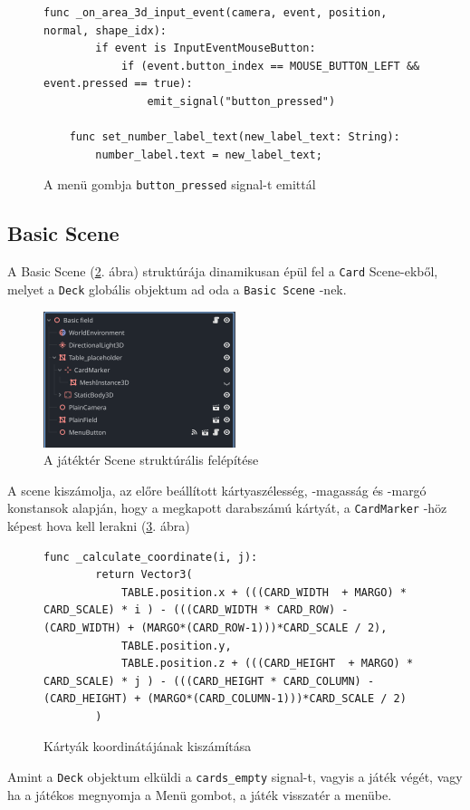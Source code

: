 \begin{figure}[H]
    \centering
    \begin{lstlisting}[language=GDScript]
    func _on_area_3d_input_event(camera, event, position, normal, shape_idx):
        if event is InputEventMouseButton:
            if (event.button_index == MOUSE_BUTTON_LEFT && event.pressed == true):
                emit_signal("button_pressed")
    
    func set_number_label_text(new_label_text: String):
        number_label.text = new_label_text;
    \end{lstlisting}
    \caption{A menü gombja  \lstinline{button_pressed} signal-t emittál}
    \label{code:button_pressed_signal}
\end{figure}

\subsection{Basic Scene}

A Basic Scene (\ref{img:basic_scene}. ábra) struktúrája dinamikusan épül fel a \lstinline{Card} Scene-ekből, melyet a \lstinline|Deck| globális objektum ad oda a \lstinline|Basic Scene| -nek. 
\begin{figure}[H]
    \centering
    \includegraphics[width=0.5\textwidth]{img/basic_field_scene_structure.png}
    \caption{A játéktér Scene struktúrális felépítése}
    \label{img:basic_scene}  
\end{figure}

A scene kiszámolja, az előre beállított kártyaszélesség, -magasság és -margó konstansok alapján, hogy a megkapott darabszámú kártyát, a \lstinline|CardMarker| -höz képest hova kell lerakni (\ref{code:calculate_coordinate}. ábra)
\begin{figure}[H]
    \centering
    \begin{lstlisting}[language=GDScript]
        func _calculate_coordinate(i, j):
        return Vector3(
            TABLE.position.x + (((CARD_WIDTH  + MARGO) * CARD_SCALE) * i ) - (((CARD_WIDTH * CARD_ROW) - (CARD_WIDTH) + (MARGO*(CARD_ROW-1)))*CARD_SCALE / 2),
            TABLE.position.y,
            TABLE.position.z + (((CARD_HEIGHT  + MARGO) * CARD_SCALE) * j ) - (((CARD_HEIGHT * CARD_COLUMN) - (CARD_HEIGHT) + (MARGO*(CARD_COLUMN-1)))*CARD_SCALE / 2)
        )
    \end{lstlisting}
    \caption{Kártyák koordinátájának kiszámítása}
    \label{code:calculate_coordinate}
\end{figure}
Amint a \lstinline|Deck| objektum elküldi a \lstinline{cards_empty} signal-t, vagyis a játék végét, vagy ha a játékos megnyomja a Menü gombot, a játék visszatér a menübe. 

